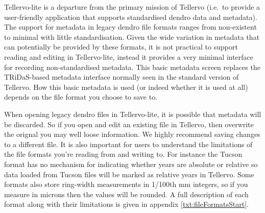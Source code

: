 Tellervo-lite is a departure from the primary mission of Tellervo (i.e.\ to provide a user-friendly application that supports standardised dendro data and metadata). The support for metadata in legacy dendro file formats ranges from non-existent to minimal with little standardisation.  Given the wide variation in metadata that can potentially be provided by these formats, it is not practical to support reading and editing in Tellervo-lite, instead it provides a very minimal interface for recording non-standardised metadata.  This basic metadata screen replaces the TRiDaS-based metadata interface normally seen in the standard version of Tellervo.  How this basic metadata is used (or indeed whether it is used at all) depends on the file format you choose to save to.  

When opening legacy dendro files in Tellervo-lite, it is possible that metadata will be discarded.  So if you open and edit an existing file in Tellervo, then overwrite the orignal you may well loose information.  We highly recommend saving changes to a different file.  It is also important for users to understand the limitations of the file formats you're reading from and writing to.  For instance the Tucson format has no mechanism for indicating whether years are absolute or relative so data loaded from Tucson files will be marked as relative years in Tellervo.  Some formats also store ring-width measurements in 1/100th mm integers, so if you measure in microns then the values will be rounded. A full description of each format along with their limitations is given in appendix \ref{txt:fileFormatsStart}.







